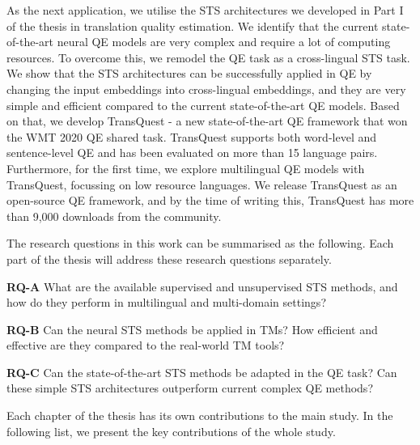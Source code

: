 As the next application, we utilise the STS architectures we developed in Part I of the thesis in translation quality estimation. We identify that the current state-of-the-art neural QE models are very complex and require a lot of computing resources. To overcome this, we remodel the QE task as a cross-lingual STS task.  We show that the STS architectures can be successfully applied in QE by changing the input embeddings into cross-lingual embeddings, and they are very simple and efficient compared to the current state-of-the-art QE models. Based on that, we develop TransQuest - a new state-of-the-art QE framework that won the WMT 2020 QE shared task. TransQuest supports both word-level and sentence-level QE and has been evaluated on more than 15 language pairs. Furthermore, for the first time, we explore multilingual QE models with TransQuest, focussing on low resource languages. We release TransQuest as an open-source QE framework, and by the time of writing this, TransQuest has more than 9,000 downloads from the community. 

The research questions in this work can be summarised as the following. Each part of the thesis will address these research questions separately.

\textbf{RQ-A} What are the available supervised and unsupervised STS methods, and how do they perform in multilingual and multi-domain settings? 

\textbf{RQ-B} Can the neural STS methods be applied in TMs? How efficient and effective are they compared to the real-world TM tools?

\textbf{RQ-C} Can the state-of-the-art STS methods be adapted in the QE task? Can these simple STS architectures outperform current complex QE methods? 

Each chapter of the thesis has its own contributions to the main study. In the following list, we present the key contributions of the whole study.

